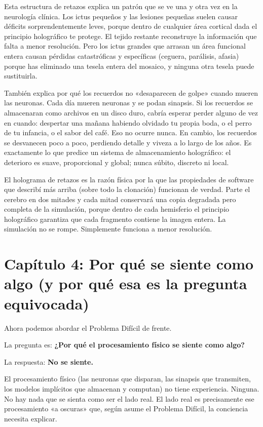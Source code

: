 \documentclass[11pt, twoside, openright]{book}
\begin{document}
Esta estructura de retazos explica un patrón que se ve una y otra vez en la neurología clínica. Los ictus pequeños y las lesiones pequeñas suelen causar déficits sorprendentemente leves, porque dentro de cualquier área cortical dada el principio holográfico te protege. El tejido restante reconstruye la información que falta a menor resolución. Pero los ictus grandes que arrasan un área funcional entera causan pérdidas catastróficas y específicas (ceguera, parálisis, afasia) porque has eliminado una tesela entera del mosaico, y ninguna otra tesela puede sustituirla.

También explica por qué los recuerdos no «desaparecen de golpe» cuando mueren las neuronas. Cada día mueren neuronas y se podan sinapsis. Si los recuerdos se almacenaran como archivos en un disco duro, cabría esperar perder alguno de vez en cuando: despertar una mañana habiendo olvidado tu propia boda, o el perro de tu infancia, o el sabor del café. Eso no ocurre nunca. En cambio, los recuerdos se desvanecen poco a poco, perdiendo detalle y viveza a lo largo de los años. Es exactamente lo que predice un sistema de almacenamiento holográfico: el deterioro es suave, proporcional y global; nunca súbito, discreto ni local.

El holograma de retazos es la razón física por la que las propiedades de software que describí más arriba (sobre todo la clonación) funcionan de verdad. Parte el cerebro en dos mitades y cada mitad conservará una copia degradada pero completa de la simulación, porque dentro de cada hemisferio el principio holográfico garantiza que cada fragmento contiene la imagen entera. La simulación no se rompe. Simplemente funciona a menor resolución.


\chapter*{Capítulo 4: Por qué se siente como algo (y por qué esa es la pregunta equivocada)}

Ahora podemos abordar el Problema Difícil de frente.

La pregunta es: \textbf{¿Por qué el procesamiento físico se siente como algo?}

La respuesta: \textbf{No se siente.}

El procesamiento físico (las neuronas que disparan, las sinapsis que transmiten, los modelos implícitos que almacenan y computan) no tiene experiencia. Ninguna. No hay nada que se sienta como ser el lado real. El lado real es precisamente ese procesamiento «a oscuras» que, según asume el Problema Difícil, la conciencia necesita explicar.
\end{document}

